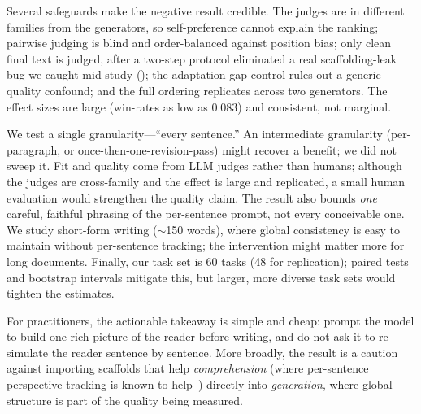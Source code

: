  Several safeguards make the negative result credible. The judges are in different
families from the generators, so self-preference cannot explain the ranking; pairwise judging is
blind and order-balanced against position bias; only clean final text is judged, after a two-step
protocol eliminated a real scaffolding-leak bug we caught mid-study (); the
adaptation-gap control rules out a generic-quality confound; and the full ordering replicates
across two generators. The effect sizes are large (win-rates as low as $0.083$) and consistent,
not marginal.

 We test a single granularity---``every sentence.'' An intermediate granularity
(per-paragraph, or once-then-one-revision-pass) might recover a benefit; we did not sweep it. Fit
and quality come from LLM judges rather than humans; although the judges are cross-family and the
effect is large and replicated, a small human evaluation would strengthen the quality claim. The
result also bounds \emph{one} careful, faithful phrasing of the per-sentence prompt, not every
conceivable one. We study short-form writing ($\sim$150 words), where global consistency is easy
to maintain without per-sentence tracking; the intervention might matter more for long documents.
Finally, our task set is 60 tasks (48 for replication); paired tests and bootstrap intervals
mitigate this, but larger, more diverse task sets would tighten the estimates.

 For practitioners, the actionable takeaway is simple and cheap:
prompt the model to build one rich picture of the reader before writing, and do not ask it to
re-simulate the reader sentence by sentence. More broadly, the result is a caution against
importing scaffolds that help \emph{comprehension} (where per-sentence perspective tracking is
known to help~\citep{perceptom2024}) directly into \emph{generation}, where global structure is
part of the quality being measured.
